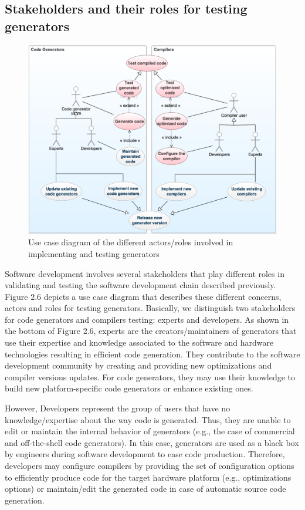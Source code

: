 \subsection{Stakeholders and their roles for testing generators}
\begin{figure}[h]
	\center
	\includegraphics[scale=0.54]{Background/fig/usecase}
	\caption{Use case diagram of the different actors/roles involved in implementing and testing generators}
\end{figure}
Software development involves several stakeholders that play different roles in validating and testing the software development chain described previously.
Figure 2.6 depicts a use case diagram that describes these different concerns, actors and roles for testing generators.
Basically, we distinguish two stakeholders for code generators and compilers testing: experts and developers. As shown in the bottom of Figure 2.6, experts are the creators/maintainers of generators that use their expertise and knowledge associated to the software and hardware technologies resulting in efficient code generation. They contribute to the software development community by creating and providing new optimizations and compiler versions updates. For code generators, they may use their knowledge to build new platform-specific code generators or enhance existing ones. 

However, Developers represent the group of users that have no knowledge/expertise about the way code is generated. Thus, they are unable to edit or maintain the internal behavior of generators (e.g., the case of commercial and off-the-shell code generators). In this case, generators are used as a black box by engineers during software development to ease code production. Therefore, developers may configure compilers by providing the set of configuration options to efficiently produce code for the target hardware platform (e.g., optimizations options) or maintain/edit the generated code in case of automatic source code generation.

